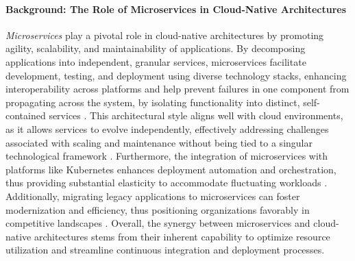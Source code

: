 \documentclass[11pt, a4paper, oneside, draft]{scrartcl}
\begin{document}
            \paragraph{Background: The Role of Microservices in Cloud-Native Architectures}
                \textit{Microservices} play a pivotal role in cloud-native architectures by
                promoting agility, scalability, and maintainability of applications.
                By decomposing applications into independent, granular services, microservices
                facilitate development, testing, and deployment using diverse technology stacks,
                enhancing interoperability across platforms
                \parencites[p.~1]{waseem2020}[p.~1]{larrucea2018} and help prevent failures
                in one component from propagating across the system, by isolating functionality into
                distinct, self-contained services \parencite[p.~62]{davis2019}.
                This architectural style aligns well with cloud environments, as it allows services
                to evolve independently, effectively addressing challenges associated with scaling
                and maintenance without being tied to a singular technological framework
                \parencite[pp.~202--203]{balalaie2016}.
                Furthermore, the integration of microservices with platforms like Kubernetes
                enhances deployment automation and orchestration, thus providing substantial
                elasticity to accommodate fluctuating workloads \parencite[p.~170]{haugeland2021}.
                Additionally, migrating legacy applications to microservices can foster
                modernization and efficiency, thus positioning organizations favorably in
                competitive landscapes \parencite[p.~214]{balalaie2016}.
                Overall, the synergy between microservices and cloud-native architectures stems from
                their inherent capability to optimize resource utilization and streamline continuous
                integration and deployment processes.
\end{document}
